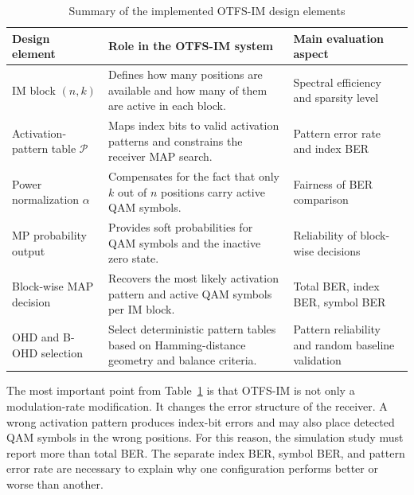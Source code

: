 \begin{table}[H]
    \centering
    \caption{Summary of the implemented OTFS-IM design elements}
    \label{tab:chapter4_design_summary}
    \begin{tabularx}{\linewidth}{>{\RaggedRight\arraybackslash}p{3.2cm}
                                  >{\RaggedRight\arraybackslash}X
                                  >{\RaggedRight\arraybackslash}p{3.2cm}}
        \toprule
        Design element & Role in the OTFS-IM system & Main evaluation aspect \\
        \midrule
        IM block \((n,k)\) &
        Defines how many positions are available and how many of them are active in each block. &
        Spectral efficiency and sparsity level \\
        \midrule
        Activation-pattern table \(\mathcal{P}\) &
        Maps index bits to valid activation patterns and constrains the receiver MAP search. &
        Pattern error rate and index BER \\
        \midrule
        Power normalization \(\alpha\) &
        Compensates for the fact that only \(k\) out of \(n\) positions carry active QAM symbols. &
        Fairness of BER comparison \\
        \midrule
        MP probability output &
        Provides soft probabilities for QAM symbols and the inactive zero state. &
        Reliability of block-wise decisions \\
        \midrule
        Block-wise MAP decision &
        Recovers the most likely activation pattern and active QAM symbols per IM block. &
        Total BER, index BER, symbol BER \\
        \midrule
        OHD and B-OHD selection &
        Select deterministic pattern tables based on Hamming-distance geometry and balance criteria. &
        Pattern reliability and random baseline validation \\
        \bottomrule
    \end{tabularx}
\end{table}

The most important point from Table~\ref{tab:chapter4_design_summary} is that OTFS-IM is not only a modulation-rate modification. It changes the error structure of the receiver. A wrong activation pattern produces index-bit errors and may also place detected QAM symbols in the wrong positions. For this reason, the simulation study must report more than total BER. The separate index BER, symbol BER, and pattern error rate are necessary to explain why one configuration performs better or worse than another.

